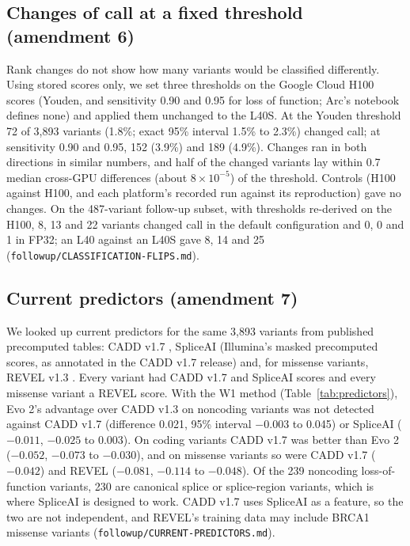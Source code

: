 \documentclass[11pt]{article}
\newcommand{\code}[1]{\texttt{#1}}
\begin{document}
\subsection{Changes of call at a fixed threshold (amendment 6)}
Rank changes do not show how many variants would be classified differently. Using stored scores
only, we set three thresholds on the Google Cloud H100 scores (Youden, and sensitivity 0.90 and
0.95 for loss of function; Arc's notebook defines none) and applied them unchanged to the L40S.
At the Youden threshold 72 of 3,893 variants (1.8\%; exact 95\% interval 1.5\% to 2.3\%) changed
call; at sensitivity 0.90 and 0.95, 152 (3.9\%) and 189 (4.9\%). Changes ran in both directions in
similar numbers, and half of the changed variants lay within 0.7 median cross-GPU differences
(about $8\times10^{-5}$) of the threshold. Controls (H100 against H100, and each platform's recorded
run against its reproduction) gave no changes. On the 487-variant follow-up subset, with thresholds
re-derived on the H100, 8, 13 and 22 variants changed call in the default configuration and 0, 0
and 1 in FP32; an L40 against an L40S gave 8, 14 and 25 (\code{followup/CLASSIFICATION-FLIPS.md}).

\subsection{Current predictors (amendment 7)}\label{sec:predictors}
We looked up current predictors for the same 3,893 variants from published precomputed tables:
CADD v1.7 \cite{cadd17}, SpliceAI \cite{spliceai} (Illumina's masked precomputed scores, as
annotated in the CADD v1.7 release) and, for missense variants, REVEL v1.3 \cite{revel}. Every
variant had CADD v1.7 and SpliceAI scores and every missense variant a REVEL score. With the W1
method (Table~\ref{tab:predictors}), Evo 2's advantage over CADD v1.3 on noncoding variants was not
detected against CADD v1.7 (difference 0.021, 95\% interval $-0.003$ to 0.045) or SpliceAI
($-0.011$, $-0.025$ to 0.003). On coding variants CADD v1.7 was better than Evo 2 ($-0.052$,
$-0.073$ to $-0.030$), and on missense variants so were CADD v1.7 ($-0.042$) and REVEL ($-0.081$,
$-0.114$ to $-0.048$). Of the 239 noncoding loss-of-function variants, 230 are canonical splice or
splice-region variants, which is where SpliceAI is designed to work. CADD v1.7 uses SpliceAI as a
feature, so the two are not independent, and REVEL's training data may include BRCA1 missense
variants (\code{followup/CURRENT-PREDICTORS.md}).
\end{document}
